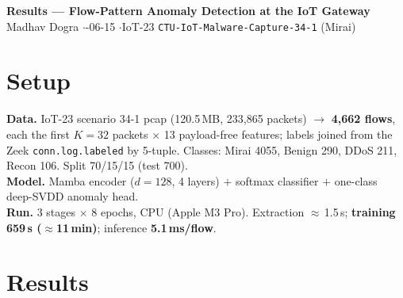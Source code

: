 \documentclass[11pt,a4paper]{article}
\newcommand{\hd}[1]{\textbf{\textcolor{accent}{#1}}}
\begin{document}
\begin{center}
{\Large\bfseries Results --- Flow-Pattern Anomaly Detection at the IoT Gateway} \\[2pt]
{\small Madhav Dogra \quad$\cdot$-06-15 \quad$\cdot$\quad IoT-23 \texttt{CTU-IoT-Malware-Capture-34-1} (Mirai)}
\end{center}
\vspace{-2pt}

\section*{Setup}
\hd{Data.} IoT-23 scenario 34-1 pcap (120.5\,MB, 233{,}865 packets) $\rightarrow$ \textbf{4{,}662 flows}, each the first $K{=}32$ packets $\times$ 13 payload-free features; labels joined from the Zeek \texttt{conn.log.labeled} by 5-tuple. Classes: Mirai 4055, Benign 290, DDoS 211, Recon 106. Split 70/15/15 (test 700).\\
\hd{Model.} Mamba encoder ($d{=}128$, 4 layers) $+$ softmax classifier $+$ one-class deep-SVDD anomaly head.\\
\hd{Run.} 3 stages $\times$ 8 epochs, CPU (Apple M3 Pro). Extraction $\approx$\,1.5\,s; \textbf{training 659\,s ($\approx$11\,min)}; inference \textbf{5.1\,ms/flow}.

\section*{Results}
\end{document}
